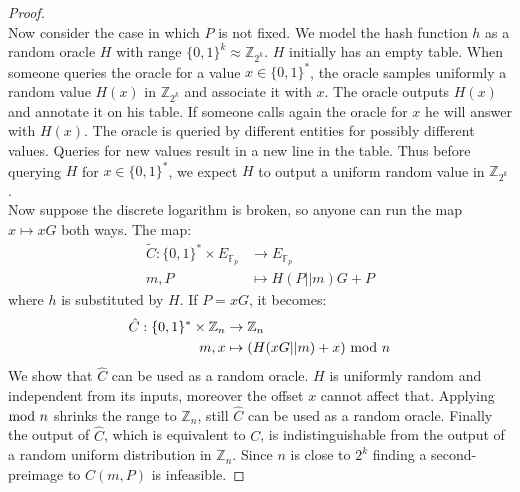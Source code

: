 \begin{proof}
	\\
	Now consider the case in which $P$ is not fixed.
	We model the hash function $h$ as a random oracle $H$ with range $\{0,1\}^k\approx \mathbb{Z}_{2^k}$.
	$H$ initially has an empty table. 
	When someone queries the oracle for a value $x \in \{0,1\}^*$,
	the oracle samples uniformly a random value $H(x)$ in $\mathbb{Z}_{2^k}$ and associate it with $x$.
	The oracle outputs $H(x)$ and annotate it on his table.
	If someone calls again the oracle for $x$ he will answer with $H(x)$.
	The oracle is queried by different entities for possibly different values.
	Queries for new values result in a new line in the table.
	Thus before querying $H$ for $x \in \{0,1\}^*$, we expect $H$ to output a uniform random value in $\mathbb{Z}_{2^k}$.
	\\
	Now suppose the  discrete logarithm is broken, so anyone can run the map $x \mapsto xG$ both ways.
	The map:
	\begin{equation*}
	\begin{split}
	\tilde{C} : \{0,1\}^* \times E_{\mathbb{F}_p}  & \rightarrow E_{\mathbb{F}_p} \\
	m, P & \mapsto H(P||m)G + P
	\end{split}
	\end{equation*}
	where $h$ is substituted by $H$. 
	If $P=xG$, it becomes:
	\begin{equation*}
	\begin{split}
	\hat{C} : \{0,1\}^* \times \mathbb{Z}_n  & \rightarrow \mathbb{Z}_n \\
	m, x & \mapsto (H(xG||m) + x)\textmd{ mod }n
	\end{split}
	\end{equation*}
	We show that $\hat{C}$ can be used as a random oracle.
	$H$ is uniformly random and independent from its inputs, 
	moreover the offset $x$ cannot affect that.
	Applying $\textmd{mod }n$ shrinks the range to $\mathbb{Z}_n$,
	still $\hat{C}$ can be used as a random oracle.
	Finally the output of $\hat{C}$, which is equivalent to $C$, is indistinguishable from the output of a random uniform distribution in $\mathbb{Z}_n$.
	Since $n$ is close to $2^k$ finding a second-preimage to $C(m,P)$ is infeasible. 
\end{proof}

